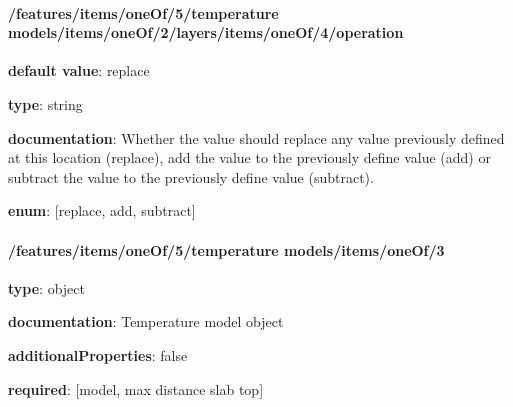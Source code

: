 \begin{itemized}
\end{itemized}\paragraph{/features/items/oneOf/5/temperature models/items/oneOf/2/layers/items/oneOf/4/operation} \begin{itemized}
\item {\bf default value}: replace
\item {\bf type}: string
\item {\bf documentation}: Whether the value should replace any value previously defined at this location (replace), add the value to the previously define value (add) or subtract the value to the previously define value (subtract).
\item {\bf enum}: [replace, add, subtract]\end{itemized}\paragraph{/features/items/oneOf/5/temperature models/items/oneOf/3} \begin{itemized}
\item {\bf type}: object
\item {\bf documentation}: Temperature model object
\item {\bf additionalProperties}: false
\item {\bf required}: [model, max distance slab top]\end{itemized}
